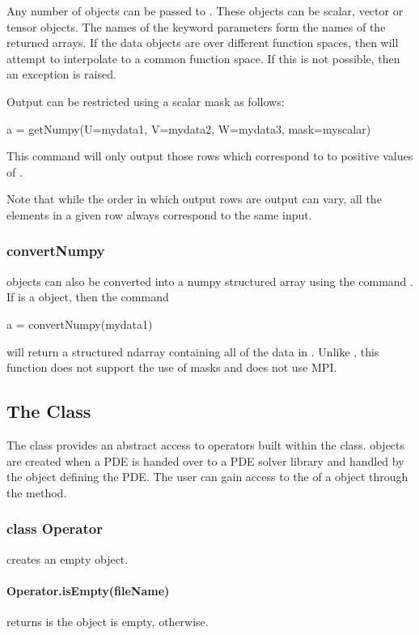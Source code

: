 Any number of \Data objects can be passed to . These objects can be scalar, vector or tensor \Data objects. The names of the keyword parameters form the names of the returned arrays.
If the data objects are over different function spaces, then 
will attempt to interpolate to a common function space.
If this is not possible, then an exception is raised.

Output can be restricted using a scalar mask as follows:
\begin{python}
  a = getNumpy(U=mydata1, V=mydata2, W=mydata3, mask=myscalar)
\end{python}
This command will only output those rows which correspond to to positive
values of .

Note that while the order in which output rows are output can vary, all the elements
in a given row always correspond to the same input.

\subsubsection{convertNumpy}
\Data objects can also be converted into a numpy structured array using the command .
If  is a \Data object, then the command
\begin{python}
  a = convertNumpy(mydata1)
\end{python}
will return a structured ndarray containing all of the data in . Unlike , this function
does not support the use of masks and does not use MPI.

\subsection{The \Operator Class}
The \Operator class provides an abstract access to operators built
within the \LinearPDE class. \Operator objects are created
when a PDE is handed over to a PDE solver library and handled
by the \LinearPDE object defining the PDE. The user can gain access
to the \Operator of a \LinearPDE object through the 
method.

\subsubsection*{class Operator}
creates an empty \Operator object.


\paragraph{Operator.isEmpty(fileName)}
returns \True is the object is empty, \False otherwise.


